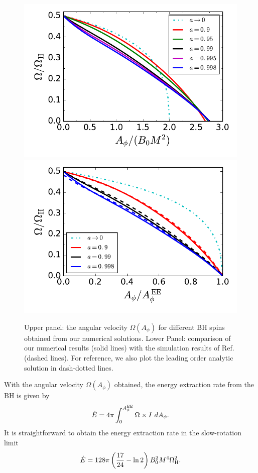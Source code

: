 \documentclass[aps,prd,reprint,nofootinbib, superscriptaddress]{revtex4-1}
\def\Ap{A_\phi}
\def\be{\begin{equation}}
\def\ee{\end{equation}}
\def\WH{\Omega_{\rm H}}
\def\AEE{A_\phi^{\rm EE}}
\begin{document}
\begin{figure}
\includegraphics[scale=0.7]{f2a}
\includegraphics[scale=0.7]{f2b}
\caption{\label{fig:omega} Upper panel: the angular velocity  $\Omega(\Ap)$ for different BH spins
obtained from our numerical solutions.
Lower Panel: comparison of our numerical results (solid lines) with the simulation results of
Ref. \cite{East2018} (dashed lines). For reference, we also plot the leading order analytic solution in
dash-dotted lines.}
\end{figure}


With the angular velocity $\Omega(\Ap)$ obtained, the energy extraction rate from the BH is given by
\be
\label{eq:Edot}
\dot E = 4\pi \int_0^{\AEE} \Omega \times I \ d \Ap.
\ee
It is straightforward to obtain the energy extraction rate in the slow-rotation limit
\be
\label{eq:lowEdot}
\dot E = 128\pi \left(\frac{17}{24}-\ln 2\right) B_0^2 M^4 \WH^2.
\ee
\end{document}
